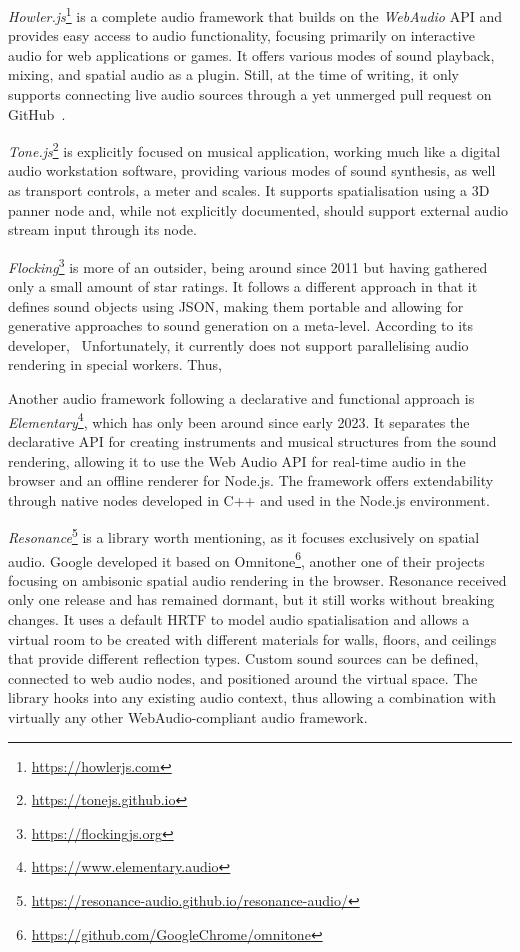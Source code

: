 

\emph{Howler.js}\footnote{\url{https://howlerjs.com}} is a complete audio framework that builds on the \emph{WebAudio} \ac{API} and provides easy access to audio functionality, focusing primarily on interactive audio for web applications or games.
It offers various modes of sound playback, mixing, and spatial audio as a plugin. Still, at the time of writing, it only supports connecting live audio sources through a yet unmerged pull request on GitHub~\parencite{githubHowlerPullRequest}.

\emph{Tone.js}\footnote{\url{https://tonejs.github.io}} is explicitly focused on musical application, working much like a digital audio workstation software, providing various modes of sound synthesis, as well as transport controls, a meter and scales.
It supports spatialisation using a \ac{3D} panner node and, while not explicitly documented, should support external audio stream input through its  node.

\emph{Flocking}\footnote{\url{https://flockingjs.org}} is more of an outsider, being around since 2011 but having gathered only a small amount of star ratings.
It follows a different approach in that it defines sound objects using \ac{JSON}, making them portable and allowing for generative approaches to sound generation on a meta-level.
According to its developer,~ Unfortunately, it currently does not support parallelising audio rendering in special workers.
Thus,~

Another audio framework following a declarative and functional approach is \emph{Elementary}\footnote{\url{https://www.elementary.audio}}, which has only been around since early 2023.
It separates the declarative \ac{API} for creating instruments and musical structures from the sound rendering, allowing it to use the Web Audio \ac{API} for real-time audio in the browser and an offline renderer for Node.js.
The framework offers extendability through native nodes developed in C++ and used in the Node.js environment.

\emph{Resonance}\footnote{\url{https://resonance-audio.github.io/resonance-audio/}} is a library worth mentioning, as it focuses exclusively on spatial audio.
Google developed it based on Omnitone\footnote{\url{https://github.com/GoogleChrome/omnitone}}, another one of their projects focusing on ambisonic spatial audio rendering in the browser.
Resonance received only one release and has remained dormant, but it still works without breaking changes.
It uses a default \ac{HRTF} to model audio spatialisation and allows a virtual room to be created with different materials for walls, floors, and ceilings that provide different reflection types.
Custom sound sources can be defined, connected to web audio nodes, and positioned around the virtual space.
The library hooks into any existing audio context, thus allowing a combination with virtually any other WebAudio-compliant audio framework.

